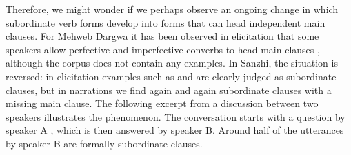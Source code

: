 Therefore, we might wonder if we perhaps observe an ongoing change in which subordinate verb forms develop into forms that can head independent main clauses. For Mehweb Dargwa it has been observed in elicitation that some speakers allow perfective and imperfective converbs to head main clauses \citep{KustovaForthcoming}, although the corpus does not contain any examples. In Sanzhi, the situation is reversed: in elicitation examples such as  and  are clearly judged as subordinate clauses, but in narrations we find again and again subordinate clauses with a missing main clause. The following excerpt from a discussion between two speakers illustrates the phenomenon. The conversation starts with a question by speaker A , which is then answered by speaker B. Around half of the utterances by speaker B are formally subordinate clauses.
%
